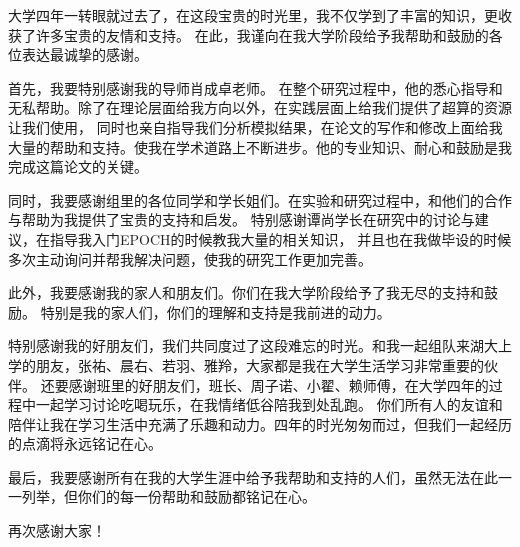 
大学四年一转眼就过去了，在这段宝贵的时光里，我不仅学到了丰富的知识，更收获了许多宝贵的友情和支持。
在此，我谨向在我大学阶段给予我帮助和鼓励的各位表达最诚挚的感谢。

首先，我要特别感谢我的导师肖成卓老师。
在整个研究过程中，他的悉心指导和无私帮助。除了在理论层面给我方向以外，在实践层面上给我们提供了超算的资源让我们使用，
同时也亲自指导我们分析模拟结果，在论文的写作和修改上面给我大量的帮助和支持。使我在学术道路上不断进步。他的专业知识、耐心和鼓励是我完成这篇论文的关键。

同时，我要感谢组里的各位同学和学长姐们。在实验和研究过程中，和他们的合作与帮助为我提供了宝贵的支持和启发。
特别感谢谭尚学长在研究中的讨论与建议，在指导我入门EPOCH的时候教我大量的相关知识，
并且也在我做毕设的时候多次主动询问并帮我解决问题，使我的研究工作更加完善。

此外，我要感谢我的家人和朋友们。你们在我大学阶段给予了我无尽的支持和鼓励。
特别是我的家人们，你们的理解和支持是我前进的动力。

特别感谢我的好朋友们，我们共同度过了这段难忘的时光。和我一起组队来湖大上学的朋友，张祐、晨右、若羽、雅羚，大家都是我在大学生活学习非常重要的伙伴。
还要感谢班里的好朋友们，班长、周子诺、小翟、赖师傅，在大学四年的过程中一起学习讨论吃喝玩乐，在我情绪低谷陪我到处乱跑。
你们所有人的友谊和陪伴让我在学习生活中充满了乐趣和动力。四年的时光匆匆而过，但我们一起经历的点滴将永远铭记在心。

最后，我要感谢所有在我的大学生涯中给予我帮助和支持的人们，虽然无法在此一一列举，但你们的每一份帮助和鼓励都铭记在心。

再次感谢大家！
